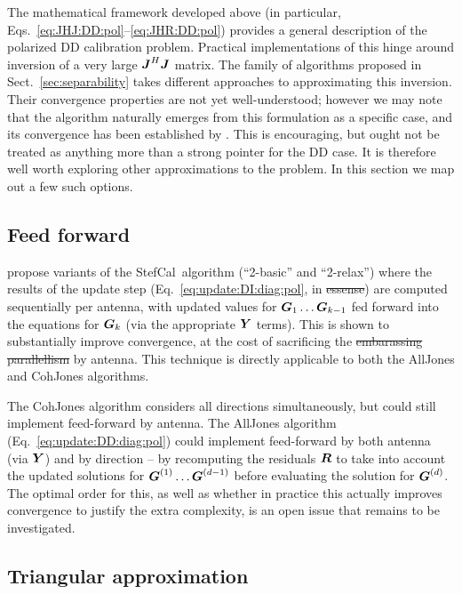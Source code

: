 \documentclass[useAMS,usenatbib]{mn2e}
\newcommand{\mat}[1]{{\bmath{#1}}}
\newcommand{\JJ}{\mat{J}} %
\newcommand{\RR}{\mat{R}}
\newcommand{\GG}{\mat{G}}
\newcommand{\JHJ}{\JJ^H\JJ} %
\newcommand{\StefCal}{{\sc StefCal}}
\numberwithin{equation}{section}
\providecommand{\DIFadd}[1]{{\protect\color{blue}\uwave{#1}}} %
\providecommand{\DIFdel}[1]{{\protect\color{red}\sout{#1}}}                      %
\providecommand{\DIFaddbegin}{} %
\providecommand{\DIFaddend}{} %
\providecommand{\DIFdelbegin}{} %
\providecommand{\DIFdelend}{} %
\begin{document}
The mathematical framework developed above (in particular, Eqs.~\ref{eq:JHJ:DD:pol}--\ref{eq:JHR:DD:pol}) provides
a general description of the polarized DD calibration problem. Practical implementations of this hinge around inversion of
a very large $\JHJ$ matrix. The family of algorithms proposed in Sect.~\ref{sec:separability} takes different approaches
to approximating this inversion. Their convergence properties are not yet well-understood; however we may note that 
the {\sc \StefCal} algorithm naturally emerges from this formulation as a specific case, and its convergence has been 
established by \citet{Stefcal}. This is encouraging, but ought not be treated as anything more than a strong pointer for 
the DD case. It is therefore well worth exploring other approximations to the problem. In this section we map out a few 
such options.

\subsection{Feed forward}
\label{sec:feed-forward}

\citet{Stefcal-URSI} propose variants of the \StefCal\ algorithm (``2-basic'' and ``2-relax'') where the results of the 
update step (Eq.~\ref{eq:update:DI:diag:pol}, in \DIFdelbegin \DIFdel{essense}\DIFdelend \DIFaddbegin \DIFadd{essence}\DIFaddend ) are computed sequentially per antenna, with updated
values for $\GG_1\dots\GG_{k-1}$ fed forward into the equations for $\GG_k$ (via the appropriate $\YY$ terms). This is shown to 
substantially improve convergence, at the cost of sacrificing the \DIFdelbegin \DIFdel{embarassing parallellism }\DIFdelend \DIFaddbegin \DIFadd{embarrassing parallelism }\DIFaddend by antenna. This technique 
is directly applicable to both the {\sc AllJones} and {\sc CohJones} algorithms. 

The {\sc CohJones} algorithm considers all directions simultaneously, but could still implement feed-forward by antenna.
The {\sc AllJones} algorithm (Eq.~\ref{eq:update:DD:diag:pol}) could implement feed-forward by both antenna (via $\YY$) and 
by direction -- by recomputing the residuals $\RR$ to take into account the updated solutions for $\GG^{(1)}\dots\GG^{(d-1)}$ before
evaluating the solution for $\GG^{(d)}$.  The optimal order for this, as well as whether in practice this actually 
improves convergence to justify the extra complexity, is an open issue that remains to be investigated.

\subsection{Triangular approximation}
\end{document}
